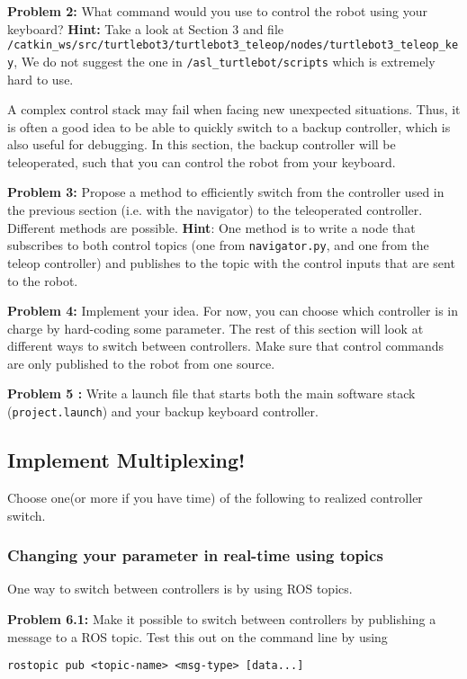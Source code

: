 \documentclass{article}
\begin{document}
\textbf{Problem 2: } What command would you use to control the robot using your keyboard? \textbf{Hint:} Take a look at Section 3 and file \texttt{/catkin\_ws/src/turtlebot3/turtlebot3\_teleop/nodes/turtlebot3\_teleop\_key}, We do not suggest the one in \texttt{/asl\_turtlebot/scripts} which is extremely hard to use.

A complex control stack may fail when facing new unexpected situations. Thus, it is often a good idea to be able to quickly switch to a backup controller, which is also useful for debugging. In this section, the backup controller will be teleoperated, such that you can control the robot from your keyboard. 

\textbf{Problem 3: } Propose a method to efficiently switch from the controller used in the previous section (i.e. with the navigator) to the teleoperated controller. Different methods are possible.
\textbf{Hint}: One method is to write a node that subscribes to both control topics (one from \texttt{navigator.py}, and one from the teleop controller) and publishes to the topic with the control inputs that are sent to the robot.

\textbf{Problem 4: } Implement your idea. For now, you can choose which controller is in charge by hard-coding some parameter. The rest of this section will look at different ways to switch between controllers. Make sure that control commands are only published to the robot from one source.

\textbf{Problem 5 : } Write a launch file that starts both the main software stack (\texttt{project.launch}) and your backup keyboard controller. 

\subsection{Implement Multiplexing!}
Choose one(or more if you have time) of the following to realized controller switch.
\subsubsection{Changing your parameter in real-time using topics}
One way to switch between controllers is by using ROS topics.

\textbf{Problem 6.1: } Make it possible to switch between controllers by publishing a message to a ROS topic. Test this out on the command line by using
\begin{lstlisting}
rostopic pub <topic-name> <msg-type> [data...]
\end{lstlisting}
\end{document}

